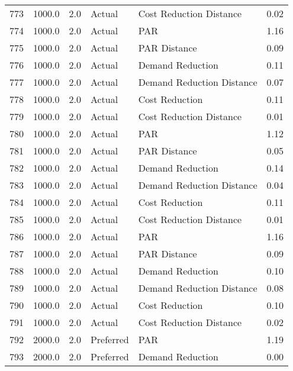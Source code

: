 \begin{longtable}{lrrllr}
773  &       1000.0 &     2.0 &         Actual &    Cost Reduction Distance &   0.02 \\
774  &       1000.0 &     2.0 &         Actual &                        PAR &   1.16 \\
775  &       1000.0 &     2.0 &         Actual &               PAR Distance &   0.09 \\
776  &       1000.0 &     2.0 &         Actual &           Demand Reduction &   0.11 \\
777  &       1000.0 &     2.0 &         Actual &  Demand Reduction Distance &   0.07 \\
778  &       1000.0 &     2.0 &         Actual &             Cost Reduction &   0.11 \\
779  &       1000.0 &     2.0 &         Actual &    Cost Reduction Distance &   0.01 \\
780  &       1000.0 &     2.0 &         Actual &                        PAR &   1.12 \\
781  &       1000.0 &     2.0 &         Actual &               PAR Distance &   0.05 \\
782  &       1000.0 &     2.0 &         Actual &           Demand Reduction &   0.14 \\
783  &       1000.0 &     2.0 &         Actual &  Demand Reduction Distance &   0.04 \\
784  &       1000.0 &     2.0 &         Actual &             Cost Reduction &   0.11 \\
785  &       1000.0 &     2.0 &         Actual &    Cost Reduction Distance &   0.01 \\
786  &       1000.0 &     2.0 &         Actual &                        PAR &   1.16 \\
787  &       1000.0 &     2.0 &         Actual &               PAR Distance &   0.09 \\
788  &       1000.0 &     2.0 &         Actual &           Demand Reduction &   0.10 \\
789  &       1000.0 &     2.0 &         Actual &  Demand Reduction Distance &   0.08 \\
790  &       1000.0 &     2.0 &         Actual &             Cost Reduction &   0.10 \\
791  &       1000.0 &     2.0 &         Actual &    Cost Reduction Distance &   0.02 \\
792  &       2000.0 &     2.0 &      Preferred &                        PAR &   1.19 \\
793  &       2000.0 &     2.0 &      Preferred &           Demand Reduction &   0.00 \\

\end{longtable}
